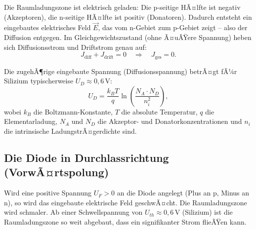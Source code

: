﻿\documentclass[12pt, a4paper]{article}
\begin{document}
	Die Raumladungszone ist elektrisch geladen: Die p-seitige HÃ¤lfte ist negativ
	(Akzeptoren), die n-seitige HÃ¤lfte ist positiv (Donatoren). Dadurch entsteht
	ein eingebautes elektrisches Feld $\vec{E}$, das vom n-Gebiet zum p-Gebiet
	zeigt -- also der Diffusion entgegen. Im Gleichgewichtszustand (ohne Ã¤uÃŸere
	Spannung) heben sich Diffusionsstrom und Driftstrom genau auf:
	\begin{equation}
		J_{\mathrm{diff}} + J_{\mathrm{drift}} = 0 \quad \Rightarrow \quad J_{\mathrm{ges}} = 0.
	\end{equation}
	
	Die zugehÃ¶rige eingebaute Spannung (Diffusionsspannung) betrÃ¤gt fÃ¼r Silizium
	typischerweise $U_D \approx 0{,}6\,\mathrm{V}$:
	\begin{equation}
		U_D = \frac{k_B T}{q} \ln\!\left(\frac{N_A \cdot N_D}{n_i^2}\right),
	\end{equation}
	wobei $k_B$ die Boltzmann-Konstante, $T$ die absolute Temperatur, $q$ die
	Elementarladung, $N_A$ und $N_D$ die Akzeptor- und Donatorkonzentrationen und
	$n_i$ die intrinsische LadungstrÃ¤gerdichte sind.
	
	\subsection{Die Diode in Durchlassrichtung (VorwÃ¤rtspolung)}
	
	Wird eine positive Spannung $U_F > 0$ an die Diode angelegt (Plus an p, Minus
	an n), so wird das eingebaute elektrische Feld geschwÃ¤cht. Die Raumladungszone
	wird schmaler. Ab einer Schwellspannung von $U_{th} \approx 0{,}6\,\mathrm{V}$
	(Silizium) ist die Raumladungszone so weit abgebaut, dass ein signifikanter
	Strom flieÃŸen kann.
	
\end{document}

